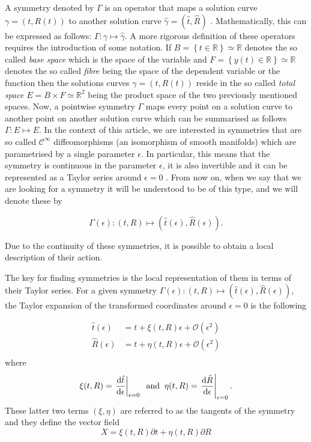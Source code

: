A symmetry denoted by $\Gamma$ is an operator that maps a solution curve $\gamma=(t,R(t))$ to another solution curve $\hat{\gamma}=(\hat{t},\hat{R})$ \cite{hydon2000symmetry}. Mathematically, this can be expressed as follows: $\Gamma:\gamma\mapsto\hat{\gamma}$. A more rigorous definition of these operators requires the introduction of some notation. If $B=\left\{t\in\mathbb{R}\right\}\simeq\mathbb{R}$ denotes the so called \textit{base space} which is the space of the variable and $F=\left\{y(t)\in\mathbb{R}\right\}\simeq\mathbb{R}$ denotes the so called \textit{fibre} being the space of the dependent variable or the function then the solutions curves $\gamma=(t,R(t))$ reside in the so called \textit{total space} $E=B\times F\simeq\mathbb{R}^2$ being the product space of the two previously mentioned spaces. Now, a pointwise symmetry $\Gamma$ maps every point on a solution curve to another point on another solution curve which can be summarised as follows $\Gamma:E\mapsto E$. In the context of this article, we are interested in symmetries that are so called $\mathcal{C}^\infty$ diffeomorphisms (an isomorphism of smooth manifolds) which are parametrised by a single parameter $\epsilon$. In particular, this means that the symmetry is continuous in the parameter $\epsilon$, it is also invertible and it can be represented as a Taylor series around $\epsilon=0$ \cite{hydon2000symmetry}. From now on, when we say that we are looking for a symmetry it will be understood to be of this type, and we will denote these by

$$\Gamma (\epsilon):(t,R)\mapsto(\hat{t}(\epsilon),\hat{R}(\epsilon)).$$

Due to the continuity of these symmetries, it is possible to obtain a local description of their action.

The key for finding symmetries is the local representation of them in terms of their Taylor series. For a given symmetry $\Gamma (\epsilon):(t,R)\mapsto(\hat{t}(\epsilon),\hat{R}(\epsilon))$, the Taylor expansion of the transformed coordinates around $\epsilon=0$ is the following

\begin{align*}
\hat{t}(\epsilon)&=t+\xi(t,R)\epsilon+\mathcal{O}\left(\epsilon^2\right)\\
\hat{R}(\epsilon)&=t+\eta(t,R)\epsilon+\mathcal{O}\left(\epsilon^2\right)\\
\end{align*}
where
$$\xi(t,R)=\left.\dv{\hat{t}}{\epsilon}\right|_{\epsilon=0}\;\;\mathrm{and}\;\;\eta(t,R)=\left.\dv{\hat{R}}{\epsilon}\right|_{\epsilon=0}.$$
These latter two terms $\left(\xi,\eta\right)$ are referred to as the tangents of the symmetry and they define the vector field
\begin{equation}
  X=\xi(t,R)\partial t+\eta(t,R)\partial R
  \label{eq:generator}
\end{equation}

